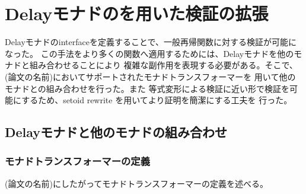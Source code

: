 \documentclass[japanese]{jssst_ppl}
\theoremstyle{definition}
\begin{document}
\iffalse
  \begin{verbatim}
  HB.mixin Record isMonadDelay (M : UU0 -> UU0) of Monad M := {
  while : forall {A B : UU0}, (A -> M(B + A)%type) -> A ->M B;
  wBisim: forall {A : UU0}, M A -> M A -> Prop;
  wBisim_refl: forall A (a: M A), wBisim a a;
  wBisim_sym: forall A (a b: M A), wBisim a b -> wBisim b a;
  wBisim_trans: forall A (a b c: M A), wBisim a b -> wBisim b c -> wBisim a c;
  fixpointE: forall (A B : UU0) (f: A -> M (B + A)%type) (a: A),
  wBisim (while f a) ((f a) >>= (sum_rect (fun => M B ) (@ret M B) (while f)));
  naturalityE: forall (A B C : UU0) (f: A -> M (B + A)%type) (g: B -> M C) (a: A),
  wBisim ((while f a) >>= g)(while (fun y => (f y) >>= (sum_rect (fun => M (C + A)%type) (M # inl \o g) (M # inr \o (@ret M A )) ) ) a);
  codiagonalE:forall (A B : UU0) (f: A -> M ((B + A) + A)%type) (a: A),
  wBisim (while ((M # ((sum_rect (fun => (B + A)%type) idfun inr)))  \o f ) a) (while (while f) a);
  bindmwB: forall (A B: UU0) (f: A -> M B)(d1 d2: M A),
  wBisim d1 d2 -> wBisim (d1 >>= f) (d2>>= f);
  bindfwB: forall (A B: UU0) (f g: A -> M B)(d: M A),
  (forall a, wBisim (f a) (g a)) -> wBisim (d >>= f) (d >>= g);
  whilewB: forall (A B : UU0) (f g: A -> M ((B + A))%type) (a: A),
  (forall a, wBisim (f a) (g a)) -> wBisim (while f a) (while g a);
  }.
        \end{verbatim}

\fi

\section{Delayモナドのを用いた検証の拡張}
Delayモナドのinterfaceを定義することで、一般再帰関数に対する検証が可能になった。
この手法をより多くの関数へ適用するためには、Delayモナドを他のモナドと組み合わせることにより
複雑な副作用を表現する必要がある。そこで、(論文の名前)においてサポートされたモナドトランスフォーマーを
用いて他のモナドとの組み合わせを行った。また
等式変形による検証に近い形で検証を可能にするため、setoid rewrite を用いてより証明を簡潔にする工夫を
行った。

\subsection{Delayモナドと他のモナドの組み合わせ}
\iffalse
  \subsubsection{モナドトランスフォーマーの定義}
  (論文の名前)にしたがってモナドトランスフォーマーの定義を述べる。
\end{document}
